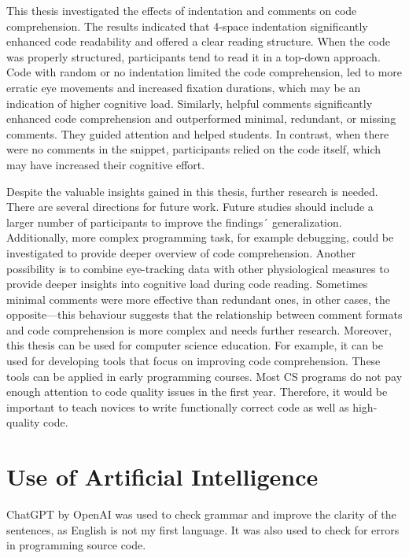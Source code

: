 This thesis investigated the effects of indentation and comments on code comprehension. The results indicated that 4-space indentation significantly enhanced code readability and offered a clear reading structure. When the code was properly structured, participants tend to read it in a top-down approach. Code with random or no indentation limited the code comprehension, led to more erratic eye movements and increased fixation durations, which may be an indication of higher cognitive load.  Similarly, helpful comments significantly enhanced code comprehension and outperformed minimal, redundant, or missing comments.  They guided attention and helped students. In contrast, when there were no comments in the snippet, participants relied on the code itself, which may have increased their cognitive effort.
 
Despite the valuable insights gained in this thesis, further research is needed. There are several directions for future work.  Future studies should include a larger number of participants to improve the findings´ generalization. Additionally, more complex programming task, for example debugging, could be investigated to provide deeper overview of code comprehension. Another possibility is to combine eye-tracking data with other physiological measures to provide deeper insights into cognitive load during code reading. Sometimes minimal comments were more effective than redundant ones, in other cases, the opposite—this behaviour suggests that the relationship between comment formats and code comprehension is more complex and needs further research.  Moreover, this thesis can be used for computer science education. For example, it can be used for developing tools that focus on improving code comprehension. These tools can be applied in early programming courses. Most CS programs do not pay enough attention to code quality issues in the first year. Therefore, it would be important to teach novices to write functionally correct code as well as high-quality code.   


\chapter{Use of Artificial Intelligence}
\label{sec:ai}

ChatGPT by OpenAI was used to check grammar and improve the clarity of the sentences, as English is not my first language. It was also used to check for errors in programming source code. 
